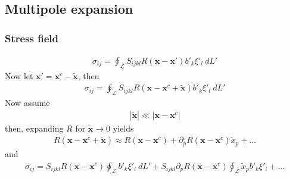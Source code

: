 \documentclass[10pt]{report}
\begin{document}
{%
\subsection{Multipole expansion}

\subsubsection{Stress field}
\begin{align}
\sigma_{ij}=\oint_\mathcal{L}S_{ijkl}R(\mathbf x-\mathbf x')b'_k\xi'_l\ dL'
\end{align}
Now let $\mathbf{x'}=\mathbf{x}^c-\tilde{\mathbf{x}}$, then
\begin{align}
\sigma_{ij}=\oint_\mathcal{L}S_{ijkl}R(\mathbf x-\mathbf x^c+\tilde{\mathbf{x}})b'_k\xi'_l\ dL'
\end{align}
Now assume 
\begin{align}
|\tilde{\mathbf{x}}|\ll |\mathbf x-\mathbf x^c|
\end{align}
then, expanding $R$ for $\tilde{\mathbf{x}}\rightarrow0$ yields
\begin{align}
R(\mathbf x-\mathbf x^c+\tilde{\mathbf{x}})\approx R(\mathbf x-\mathbf x^c)+\partial_pR(\mathbf x-\mathbf x^c)\tilde{x}_p+\ldots
\end{align}
and
\begin{align}
\sigma_{ij}=S_{ijkl}R(\mathbf x-\mathbf x^c)\oint_\mathcal{L}b'_k\xi'_l\ dL'+S_{ijkl}\partial_pR(\mathbf x-\mathbf x^c)\oint_\mathcal{L}\tilde{x}_pb'_k\xi'_l+\ldots
\end{align}

}
\end{document}
